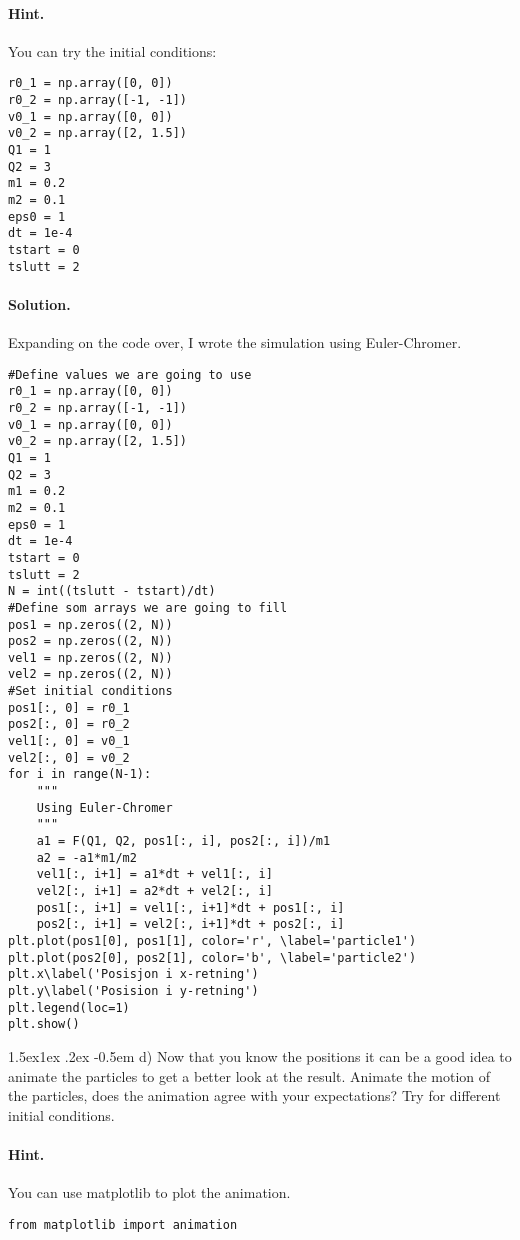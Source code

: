 \documentclass[%
oneside,                 %
final,                   %
10pt]{article}
\makeatletter
\newenvironment{doconceexercise}{}{}
\newcommand\subex{\@startsection{paragraph}{4}{\z@}%
                  {1.5ex\@plus1ex \@minus.2ex}%
                  {-0.5em}%
                  {\normalfont\normalsize\bfseries}}
\makeatother
\begin{document}
\begin{doconceexercise}

\paragraph{Hint.}
You can try the initial conditions:
\begin{verbatim}
r0_1 = np.array([0, 0])
r0_2 = np.array([-1, -1])
v0_1 = np.array([0, 0])
v0_2 = np.array([2, 1.5])
Q1 = 1
Q2 = 3
m1 = 0.2
m2 = 0.1
eps0 = 1
dt = 1e-4
tstart = 0
tslutt = 2
\end{verbatim}



\paragraph{Solution.}
Expanding on the code over, I wrote the simulation using Euler-Chromer.
\begin{verbatim}
#Define values we are going to use
r0_1 = np.array([0, 0])
r0_2 = np.array([-1, -1])
v0_1 = np.array([0, 0])
v0_2 = np.array([2, 1.5])
Q1 = 1
Q2 = 3
m1 = 0.2
m2 = 0.1
eps0 = 1
dt = 1e-4
tstart = 0
tslutt = 2
N = int((tslutt - tstart)/dt)
#Define som arrays we are going to fill
pos1 = np.zeros((2, N))
pos2 = np.zeros((2, N))
vel1 = np.zeros((2, N))
vel2 = np.zeros((2, N))
#Set initial conditions
pos1[:, 0] = r0_1
pos2[:, 0] = r0_2
vel1[:, 0] = v0_1
vel2[:, 0] = v0_2
for i in range(N-1):
    """
    Using Euler-Chromer
    """
    a1 = F(Q1, Q2, pos1[:, i], pos2[:, i])/m1
    a2 = -a1*m1/m2
    vel1[:, i+1] = a1*dt + vel1[:, i]
    vel2[:, i+1] = a2*dt + vel2[:, i]
    pos1[:, i+1] = vel1[:, i+1]*dt + pos1[:, i]
    pos2[:, i+1] = vel2[:, i+1]*dt + pos2[:, i]
plt.plot(pos1[0], pos1[1], color='r', \label='particle1')
plt.plot(pos2[0], pos2[1], color='b', \label='particle2')
plt.x\label('Posisjon i x-retning')
plt.y\label('Posision i y-retning')
plt.legend(loc=1)
plt.show()
\end{verbatim}


\subex{d)}
Now that you know the positions it can be a good idea to animate the particles to get a better look at the result. Animate the motion of the particles, does the animation agree with your expectations? Try for different initial conditions.


\paragraph{Hint.}
You can use matplotlib to plot the animation.
\begin{verbatim}
from matplotlib import animation
\end{verbatim}


\end{doconceexercise}
\end{document}
